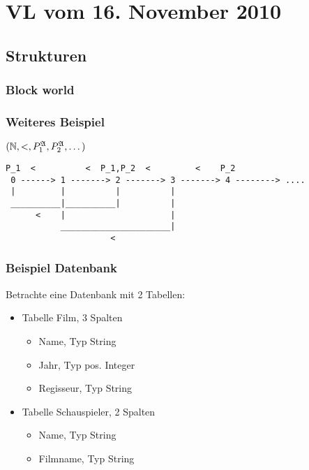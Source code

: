 \section{VL vom 16. November 2010}

\subsection{Strukturen}
\subsubsection{Block world}

\begin{center}
\end{center}

\subsubsection{Weiteres Beispiel}
$(\mathbb{N}, <, P_1^{\mathfrak{A}}, P_2^{\mathfrak{A}}, \dots)$
\begin{verbatim}
P_1  <          <  P_1,P_2  <         <    P_2
 0 ------> 1 -------> 2 -------> 3 -------> 4 --------> ....
 |         |          |          |
 __________|__________|          |
      <    |                     |
           ______________________|
                     <
\end{verbatim}

\subsubsection{Beispiel Datenbank}
Betrachte eine Datenbank mit 2 Tabellen:
\begin{itemize}
\item Tabelle Film, 3 Spalten
\begin{itemize}
\item Name, Typ String
\item Jahr, Typ pos. Integer
\item Regisseur, Typ String
\end{itemize}
\item Tabelle Schauspieler, 2 Spalten
\begin{itemize}
\item Name, Typ String
\item Filmname, Typ String
\end{itemize}
\end{itemize}

